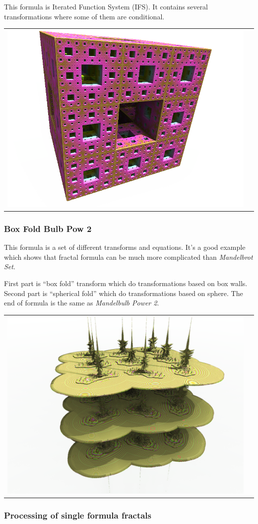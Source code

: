 This formula is Iterated Function System (IFS). It contains several
transformations where some of them are conditional. \nopagebreak

\begin{tabular}{l l}
	\includegraphics[width=0.3\linewidth]{img/manual/media/formula_menger_sponge.png}
	  &   
	\begin{minipage}[b]{0.5\linewidth}
	
	\end{minipage}
\end{tabular} 

\subsubsection{Box Fold Bulb Pow 2}
\nopagebreak

This formula is a set of different transforms and equations. It's a good example
which shows that fractal formula can be much more complicated than
\emph{Mandelbrot Set}.

First part is ``box fold'' transform which do
transformations based on box walls. Second part is ``spherical
fold'' which do transformations based on sphere.
The end of formula is the same as \emph{Mandelbulb Power 2}.\nopagebreak

\begin{tabular}{l l}
	\includegraphics[width=0.3\linewidth]{img/manual/media/formula_box_fold_pwr2.png}	
	  &   
	\begin{minipage}[b]{0.5\linewidth}
	
	\end{minipage}
\end{tabular} 

\subsubsection{Processing of single formula fractals}

